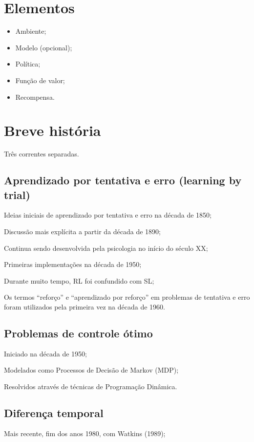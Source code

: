 \documentclass{article}
\begin{document}
\section{Elementos}

    \begin{itemize}
        \item Ambiente;
        \item Modelo (opcional);
        \item Política;
        \item Função de valor;
        \item Recompensa.
    \end{itemize}

\section{Breve história}

    Três correntes separadas.
    
    \subsection{Aprendizado por tentativa e erro (learning by trial)}
        Ideias iniciais de aprendizado por tentativa e erro na década de 1850;
        
        Discussão mais explícita a partir da década de 1890;
        
        Continua sendo desenvolvida pela psicologia no início do século XX;
        
        Primeiras implementações na década de 1950;
        
        Durante muito tempo, RL foi confundido com SL;
        
        Os termos “reforço” e “aprendizado por reforço” em problemas de tentativa e erro foram utilizados pela primeira vez na década de 1960.

    
    \subsection{Problemas de controle ótimo}
        Iniciado na década de 1950;
        
        Modelados como Processos de Decisão de Markov (MDP);
        
        Resolvidos através de técnicas de Programação Dinâmica.

    
    \subsection{Diferença temporal}
        Mais recente, fim dos anos 1980, com Watkins     (1989);
        
\end{document}
